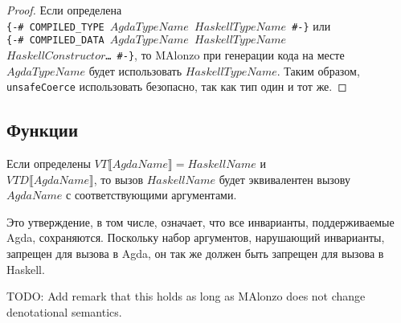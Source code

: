 \begin{proof}
Если определена\\ \texttt{\{-\# COMPILED\_TYPE \(AgdaTypeName\) \(HaskellTypeName\) \#-\}}
или\\ \texttt{\{-\# COMPILED\_DATA \(AgdaTypeName\) \(HaskellTypeName\)\\
\(HaskellConstructor\)\dots\ \#-\}},
то MAlonzo при генерации кода на месте\\ \(AgdaTypeName\) будет использовать
\(HaskellTypeName\). Таким образом,\\ \texttt{unsafeCoerce}
использовать безопасно, так как тип один и тот же.
\end{proof}

\subsection{Функции}

\begin{thm}
Если определены \(VT\llbracket AgdaName \rrbracket = HaskellName\) и\\
\(VTD\llbracket AgdaName \rrbracket\), то вызов \(HaskellName\) будет
эквивалентен вызову \\\(AgdaName\) с соответствующими аргументами.
\end{thm}

Это утверждение, в том числе, означает, что все инварианты, поддерживаемые Agda,
сохраняются. Поскольку набор аргументов, нарушающий инварианты, запрещен для вызова
в Agda, он так же должен быть запрещен для вызова в Haskell.

TODO: Add remark that this holds as long as MAlonzo does not change denotational semantics.

